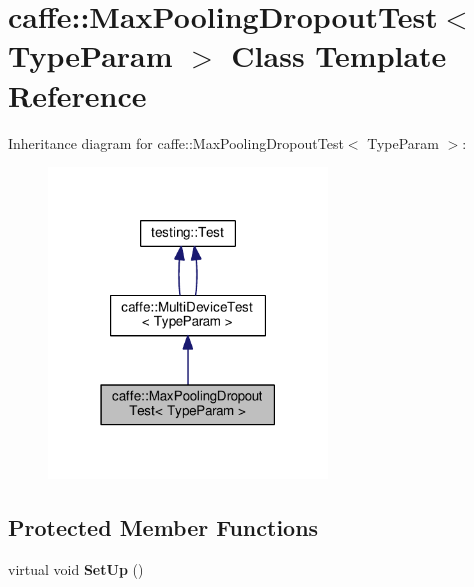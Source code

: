 \hypertarget{classcaffe_1_1_max_pooling_dropout_test}{}\section{caffe\+:\+:Max\+Pooling\+Dropout\+Test$<$ Type\+Param $>$ Class Template Reference}
\label{classcaffe_1_1_max_pooling_dropout_test}


Inheritance diagram for caffe\+:\+:Max\+Pooling\+Dropout\+Test$<$ Type\+Param $>$\+:
\nopagebreak
\begin{figure}[H]
\begin{center}
\leavevmode
\includegraphics[width=210pt]{classcaffe_1_1_max_pooling_dropout_test__inherit__graph}
\end{center}
\end{figure}
\subsection*{Protected Member Functions}
\begin{DoxyCompactItemize}
\item 
\mbox{\label{classcaffe_1_1_max_pooling_dropout_test_a5f52fbf9265065f479dcc58ef8e9b9a6}} 
virtual void {\bfseries Set\+Up} ()
\end{DoxyCompactItemize}
